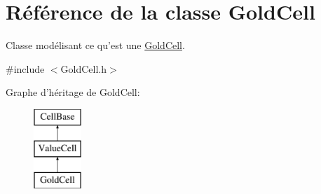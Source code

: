 \hypertarget{class_gold_cell}{\section{Référence de la classe Gold\-Cell}
\label{class_gold_cell}
}


Classe modélisant ce qu'est une \hyperlink{class_gold_cell}{Gold\-Cell}.  




{\ttfamily \#include $<$Gold\-Cell.\-h$>$}

Graphe d'héritage de Gold\-Cell\-:\begin{figure}[H]
\begin{center}
\leavevmode
\includegraphics[height=3.000000cm]{class_gold_cell}
\end{center}
\end{figure}
